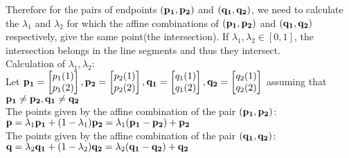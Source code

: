 \documentclass[11pt]{article}
\begin{document}
\begin{enumerate}
		Therefore for the pairs of endpoints $({\bf p_1},{\bf p_2})$ and $({\bf q_1},{\bf q_2})$, we need to calculate the $\lambda_1$ and $\lambda_2$ for which the affine combinations of $({\bf p_1},{\bf p_2})$ and $({\bf q_1},{\bf q_2})$ respectively, give the same point(the intersection). If $\lambda_1,\lambda_2\in[0,1]$, the intersection belongs in the line segments and thus they intersect.\\
		
		Calculation of $\lambda_1,\lambda_2$:\\
		Let ${\bf p_1}=\begin{bmatrix}
			p_1(1)\\p_1(2)
		\end{bmatrix},{\bf p_2}=\begin{bmatrix}
		p_2(1)\\p_2(2)
		\end{bmatrix},{\bf q_1}=\begin{bmatrix}
		q_1(1)\\q_1(2)
		\end{bmatrix},{\bf q_2}=\begin{bmatrix}
		q_2(1)\\q_2(2)
		\end{bmatrix}$ assuming that ${\bf p_1}\ne {\bf p_2},{\bf q_1}\ne {\bf q_2}$\\
	
		The points given by the affine combination of the pair $({\bf p_1},{\bf p_2})$:\\
		$\displaystyle {\bf p}=\lambda_1{\bf p_1}+(1-\lambda_1){\bf p_2}=\lambda_1({\bf p_1}-{\bf p_2})+{\bf p_2}$\\
		
		The points given by the affine combination of the pair $({\bf q_1},{\bf q_2})$:\\
		$\displaystyle {\bf q}=\lambda_2{\bf q_1}+(1-\lambda_2){\bf q_2}=\lambda_2({\bf q_1}-{\bf q_2})+{\bf q_2}$\\
		

\end{enumerate}
\end{document}

